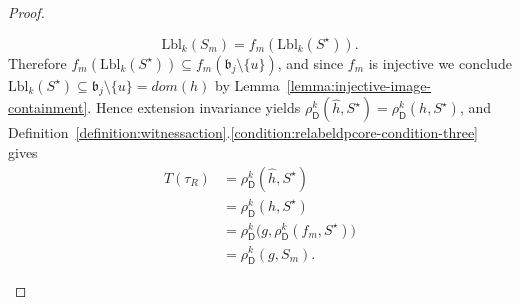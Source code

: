 \documentclass[10pt,a4paper]{amsart}
\newcommand{\abag}{\mathfrak{b}}
\newcommand{\abstractdecomposition}{\tau}
\newcommand{\action}{\rho}
\newcommand{\domain}{dom}
\newcommand{\dpcore}{\mathsf{D}}
\newcommand{\dprefutation}{R}
\newcommand{\relabelingfunction}{f}
\newcommand{\subtermToBag}{T}
\newcommand{\treewidthvalue}{k}
\newcommand{\vertexone}{u}
\newcommand{\witnessset}{S}
\begin{document}
\begin{proof}
\begin{enumerate}
	\[
	\mathrm{Lbl}_{\treewidthvalue}(\witnessset_m)=\relabelingfunction_m(\mathrm{Lbl}_{\treewidthvalue}(S^\star)).
	\]
	Therefore $\relabelingfunction_m(\mathrm{Lbl}_{\treewidthvalue}(S^\star))\subseteq \relabelingfunction_m(\abag_j\setminus\{\vertexone\})$, and since $\relabelingfunction_m$ is injective we conclude $\mathrm{Lbl}_{\treewidthvalue}(S^\star)\subseteq \abag_j\setminus\{\vertexone\}=\domain(h)$ by Lemma~\ref{lemma:injective-image-containment}.
	Hence extension invariance yields $\action_{\dpcore}^{\treewidthvalue}(\hat h,S^\star)=\action_{\dpcore}^{\treewidthvalue}(h,S^\star)$, and Definition~\ref{definition:witnessaction}.\ref{condition:relabeldpcore-condition-three} gives
		\[
		\begin{aligned}
		\subtermToBag(\abstractdecomposition_{\dprefutation})
		&= \action_{\dpcore}^{\treewidthvalue}(\hat h,S^\star)\\
		&= \action_{\dpcore}^{\treewidthvalue}(h,S^\star)\\
		&= \action_{\dpcore}^{\treewidthvalue}\bigl(g,\action_{\dpcore}^{\treewidthvalue}(\relabelingfunction_m,S^\star)\bigr)\\
		&= \action_{\dpcore}^{\treewidthvalue}(g,\witnessset_m).
		\end{aligned}
		\]


\end{enumerate}
\end{proof}
\end{document}
